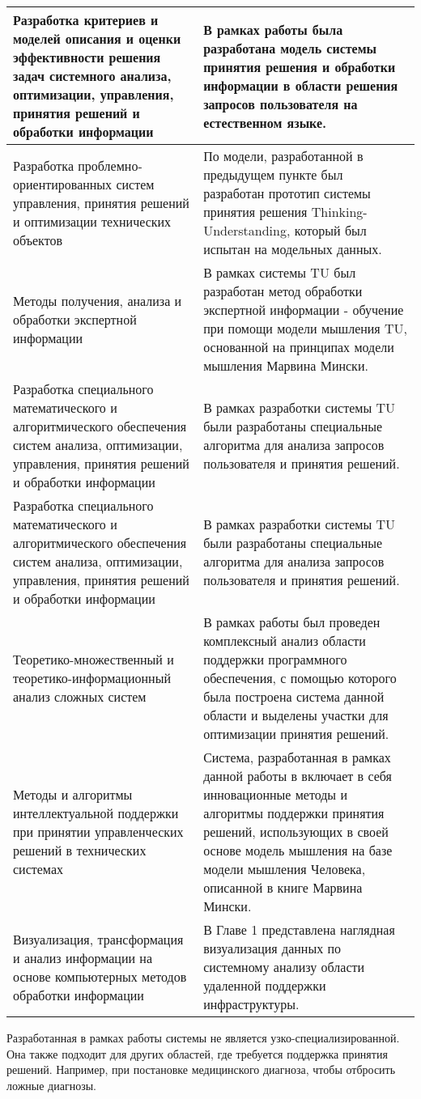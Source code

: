 \begin{longtable}{|p{7cm}|p{8cm}|}
\hline \hline
\endlastfoot
\hline
   Разработка критериев и моделей описания и оценки эффективности решения задач системного анализа, оптимизации, управления, принятия решений и обработки информации & В рамках работы была разработана модель системы принятия решения и обработки информации в области решения запросов пользователя на естественном языке. \\
   \hline
   Разработка проблемно-ориентированных систем управления, принятия решений и оптимизации технических объектов & По модели, разработанной в предыдущем пункте был разработан прототип системы принятия решения Thinking-Understanding, который был испытан на модельных данных.\\
   \hline
   Методы получения, анализа и обработки экспертной информации & В рамках системы TU был разработан метод обработки экспертной информации - обучение при помощи модели мышления TU, основанной на принципах модели мышления Марвина Мински. \\
   \hline
   Разработка специального математического и алгоритмического обеспечения систем анализа, оптимизации, управления, принятия решений и обработки информации & В рамках разработки системы TU были разработаны специальные алгоритма для анализа запросов пользователя и принятия решений.\\
  \hline 
  Разработка специального математического и алгоритмического обеспечения систем анализа, оптимизации, управления, принятия решений и обработки информации & В рамках разработки системы TU были разработаны специальные алгоритма для анализа запросов пользователя и принятия решений.\\
  \hline 
  Теоретико-множественный и теоретико-информационный анализ сложных систем & В рамках работы был проведен комплексный анализ области поддержки программного обеспечения, с помощью которого была построена система данной области и выделены участки для оптимизации принятия решений.\\
  \hline
  Методы и алгоритмы интеллектуальной поддержки при принятии управленческих решений в технических системах & Система, разработанная в рамках данной работы в включает в себя инновационные методы и алгоритмы поддержки принятия решений, использующих в своей основе модель мышления на базе модели мышления Человека, описанной в книге Марвина Мински. \\ 
  \hline
  Визуализация, трансформация и анализ информации на основе компьютерных методов обработки информации & В Главе 1 представлена наглядная визуализация данных по системному анализу области удаленной поддержки инфраструктуры. \\
  \hline	
\end{longtable}

Разработанная в рамках работы системы не является узко-специализированной. Она также подходит для других областей, где требуется поддержка принятия решений. Например, при постановке медицинского диагноза, чтобы отбросить ложные диагнозы. \\


